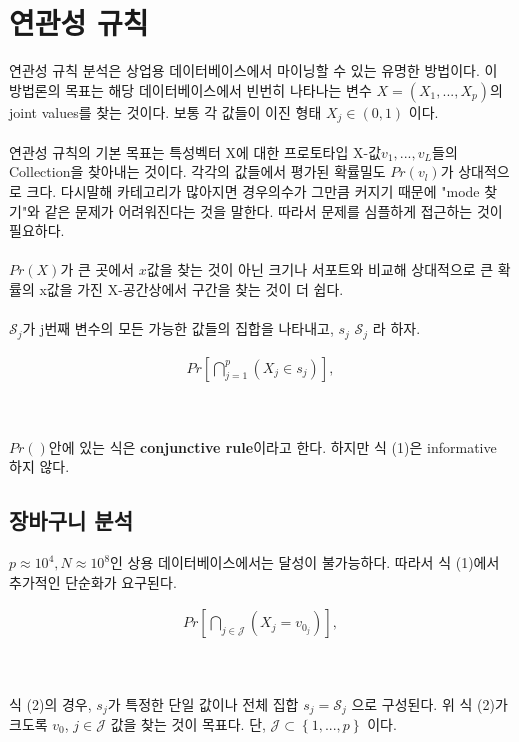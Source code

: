 \documentclass{article}
\begin{document}
\section{연관성 규칙}

연관성 규칙 분석은 상업용 데이터베이스에서 마이닝할 수 있는 유명한 방법이다. 이 방법론의 목표는 해당 데이터베이스에서 빈번히 나타나는 변수 $X = (X_1, ..., X_p)$의 joint values를 찾는 것이다. 보통 각 값들이 이진 형태 $X_j \in (0, 1)$ 이다.
\\ \\
연관성 규칙의 기본 목표는 특성벡터 X에 대한 프로토타입 X-값$v_1, ..., v_L$들의 Collection을 찾아내는 것이다. 각각의 값들에서 평가된 확률밀도 $Pr(v_l)$가 상대적으로 크다. 다시말해 카테고리가 많아지면 경우의수가 그만큼 커지기 때문에 "mode 찾기"와 같은 문제가 어려워진다는 것을 말한다. 따라서 문제를 심플하게 접근하는 것이 필요하다.
\\ \\
$Pr(X)$가 큰 곳에서 $x$값을 찾는 것이 아닌 크기나 서포트와 비교해 상대적으로 큰 확률의 x값을 가진 X-공간상에서 구간을 찾는 것이 더 쉽다.
\\ \\
$\mathcal{S}_j$가 j번째 변수의 모든 가능한 값들의 집합을 나타내고, $s_j$ \subset $\mathcal{S}_j$ 라 하자.

\begin{align}
    Pr\left [ \bigcap_{j=1}^{p}(X_j\in s_j) \right ],
\end{align}

\\ \\
$Pr()$안에 있는 식은 \textbf{conjunctive rule}이라고 한다. 하지만 식 (1)은 informative 하지 않다.

\subsection{장바구니 분석}
$p \approx 10^4, N \approx 10^8 $인 상용 데이터베이스에서는 달성이 불가능하다. 따라서 식 (1)에서 추가적인 단순화가 요구된다. 

\begin{align}
    Pr\left [ \bigcap_{j \in \mathcal{J}}(X_j = v_0_j) \right ],
\end{align}

\\ \\
식 (2)의 경우, $s_j$가 특정한 단일 값이나 전체 집합 $s_j = \mathcal{S}_j$ 으로 구성된다. 위 식 (2)가 크도록 $v_0$, $j \in \mathcal{J}$ 값을 찾는 것이 목표다.
단, $\mathcal{J} \subset \left\{1, ..., p\right\}$ 이다.
\end{document}
